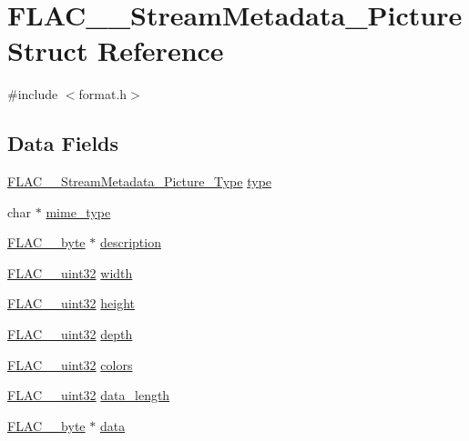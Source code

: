 \hypertarget{struct_f_l_a_c_____stream_metadata___picture}{}\section{F\+L\+A\+C\+\_\+\+\_\+\+Stream\+Metadata\+\_\+\+Picture Struct Reference}
\label{struct_f_l_a_c_____stream_metadata___picture}


{\ttfamily \#include $<$format.\+h$>$}

\subsection*{Data Fields}
\begin{DoxyCompactItemize}
\item 
\hyperlink{group__flac__format_gaf6d3e836cee023e0b8d897f1fdc9825d}{F\+L\+A\+C\+\_\+\+\_\+\+Stream\+Metadata\+\_\+\+Picture\+\_\+\+Type} \hyperlink{struct_f_l_a_c_____stream_metadata___picture_addc05a87a1da1ec7dd2301944ff2819c}{type}
\item 
char $\ast$ \hyperlink{struct_f_l_a_c_____stream_metadata___picture_a9b4af2e10b627c0e79abf4cdd79f80e0}{mime\+\_\+type}
\item 
\hyperlink{ordinals_8h_a5eb569b12d5b047cdacada4d57924ee3}{F\+L\+A\+C\+\_\+\+\_\+byte} $\ast$ \hyperlink{struct_f_l_a_c_____stream_metadata___picture_a5bbfb168b265edfb0b29cfdb71fb413c}{description}
\item 
\hyperlink{ordinals_8h_a9c4005ea7ef8d564b0cc993cdd0e4e5e}{F\+L\+A\+C\+\_\+\+\_\+uint32} \hyperlink{struct_f_l_a_c_____stream_metadata___picture_a18dc6cdef9fa6c815450671f631a1e04}{width}
\item 
\hyperlink{ordinals_8h_a9c4005ea7ef8d564b0cc993cdd0e4e5e}{F\+L\+A\+C\+\_\+\+\_\+uint32} \hyperlink{struct_f_l_a_c_____stream_metadata___picture_a76dbd1212d330807cda289660f5ee754}{height}
\item 
\hyperlink{ordinals_8h_a9c4005ea7ef8d564b0cc993cdd0e4e5e}{F\+L\+A\+C\+\_\+\+\_\+uint32} \hyperlink{struct_f_l_a_c_____stream_metadata___picture_a0f2092ddf28a6803e9c8adb7328c1967}{depth}
\item 
\hyperlink{ordinals_8h_a9c4005ea7ef8d564b0cc993cdd0e4e5e}{F\+L\+A\+C\+\_\+\+\_\+uint32} \hyperlink{struct_f_l_a_c_____stream_metadata___picture_af17c1738bab67eba049ee101acfd36f0}{colors}
\item 
\hyperlink{ordinals_8h_a9c4005ea7ef8d564b0cc993cdd0e4e5e}{F\+L\+A\+C\+\_\+\+\_\+uint32} \hyperlink{struct_f_l_a_c_____stream_metadata___picture_acb893f63a196f70263468770a90580a4}{data\+\_\+length}
\item 
\hyperlink{ordinals_8h_a5eb569b12d5b047cdacada4d57924ee3}{F\+L\+A\+C\+\_\+\+\_\+byte} $\ast$ \hyperlink{struct_f_l_a_c_____stream_metadata___picture_a9c71b5d77920e6d3aee6893795c43605}{data}
\end{DoxyCompactItemize}


